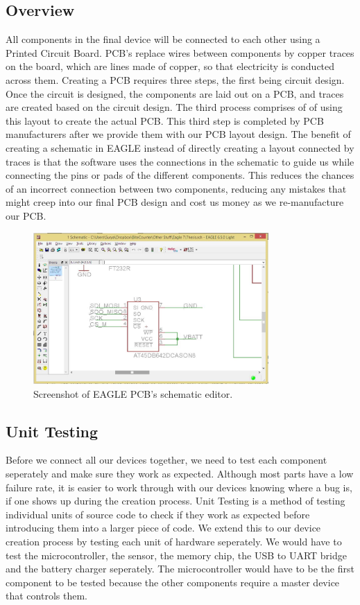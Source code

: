 \subsection{Overview}
\label{Sec:PCBDesign}
All components in the final device will be connected to each other using a Printed Circuit Board.
PCB's replace wires between components by copper traces on the board,
which are lines made of copper, so that electricity is conducted across them.
Creating a PCB requires three steps, the first being circuit design.
Once the circuit is designed, the components are laid out on a PCB, and traces are created based on the circuit design.
The third process comprises of of using this layout to create the actual PCB.
This third step is completed by PCB manufacturers after we provide them with our PCB layout design.
The benefit of creating a schematic in EAGLE instead of directly creating a layout connected by traces
is that the software uses the connections in the schematic to guide us while connecting the pins or pads of the different components.
This reduces the chances of an incorrect connection between two components,
reducing any mistakes that might creep into our final PCB design and cost us money as we re-manufacture our PCB.
\begin{figure}
\begin{center}
\includegraphics[width=0.8\textwidth]{images/EagleScreen.jpg}
\caption{Screenshot of EAGLE PCB's schematic editor.}
\label{Fig:EaglePCBScreen}
\end{center}
\end{figure}

\subsection{Unit Testing}
\label{Sec:UnitTesting}
Before we connect all our devices together,
we need to test each component seperately and make sure they work as expected.
Although most parts have a low failure rate,
it is easier to work through with our devices knowing where a bug is,
if one shows up during the creation process.
Unit Testing is a method of testing individual units of source code to check if they work as expected before introducing them into a larger piece of code.
We extend this to our device creation process by testing each unit of hardware seperately.
We would have to test the microcontroller, the sensor, the memory chip, the USB to UART bridge and the battery charger seperately.
The microcontroller would have to be the first component to be tested because the other components require a master device that controls them.

